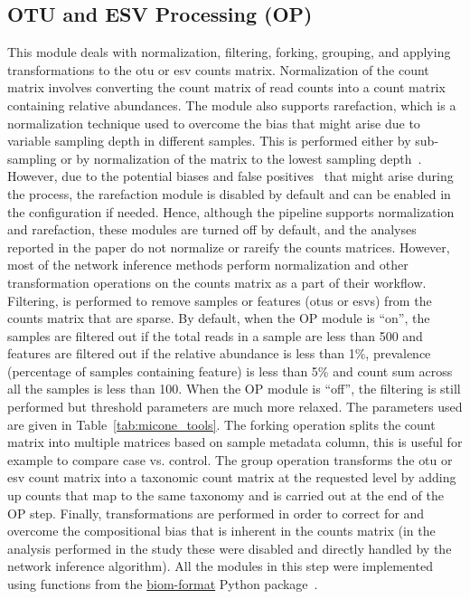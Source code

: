 \documentclass[letterpaper,12pt]{article}
\begin{document}
  \subsection*{OTU and ESV Processing (OP)}
  \vspace{-5mm}
  This module deals with normalization, filtering, forking, grouping, and applying transformations to the \ac{otu} or \ac{esv} counts matrix.
  Normalization of the count matrix involves converting the count matrix of read counts into a count matrix containing relative abundances.
  The module also supports rarefaction, which is a normalization technique used to overcome the bias that might arise due to variable sampling depth in different samples.
  This is performed either by sub-sampling or by normalization of the matrix to the lowest sampling depth~\cite{Weiss2015}.
  However, due to the potential biases and false positives~\cite{mcmurdieWasteNotWant2014,chaoCoveragebasedRarefactionExtrapolation2012} that might arise during the process, the rarefaction module is disabled by default and can be enabled in the configuration if needed.
  Hence, although the pipeline supports normalization and rarefaction, these modules are turned off by default, and the analyses reported in the paper do not normalize or rareify the counts matrices.
  However, most of the network inference methods perform normalization and other transformation operations on the counts matrix as a part of their workflow.
  Filtering, is performed to remove samples or features (\ac{otu}s or \ac{esv}s) from the counts matrix that are sparse.
  By default, when the OP module is ``on'', the samples are filtered out if the total reads in a sample are less than 500 and features are filtered out if the relative abundance is less than 1\%, prevalence (percentage of samples containing feature) is less than 5\% and count sum across all the samples is less than 100.
  When the OP module is ``off'', the filtering is still performed but threshold parameters are much more relaxed.
  The parameters used are given in Table~\ref{tab:micone_tools}.
  The forking operation splits the count matrix into multiple matrices based on sample metadata column, this is useful for example to compare case vs. control.
  The group operation transforms the \ac{otu} or \ac{esv} count matrix into a taxonomic count matrix at the requested level by adding up counts that map to the same taxonomy and is carried out at the end of the OP step.
  Finally, transformations are performed in order to correct for and overcome the compositional bias that is inherent in the counts matrix (in the analysis performed in the study these were disabled and directly handled by the network inference algorithm).
  All the modules in this step were implemented using functions from the \href{http://biom-format.org/}{biom-format} Python package~\cite{mcdonaldBiologicalObservationMatrix2012}.
\end{document}
